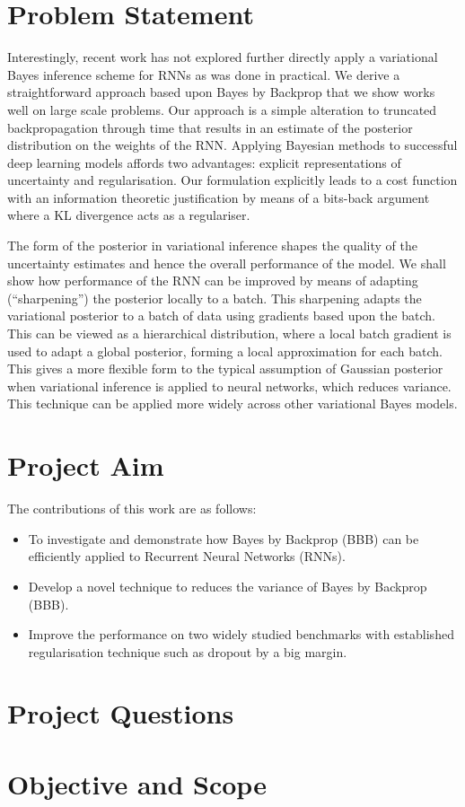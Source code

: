 
\section{Problem Statement}

Interestingly, recent work has not explored further directly apply a variational Bayes inference scheme for RNNs as was done in practical.
We derive a straightforward approach based upon Bayes by Backprop \cite{Blundell2015a} that we show works well on large scale problems.
Our approach is a simple alteration to truncated backpropagation through time that results in an estimate of the posterior distribution on the weights of the RNN.
Applying Bayesian methods to successful deep learning models affords two advantages: explicit representations of uncertainty and regularisation.
Our formulation explicitly leads to a cost function with an information theoretic justification by means of a bits-back argument \cite{Hinton1993} where a KL divergence acts as a regulariser.

The form of the posterior in variational inference shapes the quality of the uncertainty estimates and hence the overall performance of the model.
We shall show how performance of the RNN can be improved by means of adapting (``sharpening'') the posterior locally to a batch.
This sharpening adapts the variational posterior to a batch of data using gradients based upon the batch.
This can be viewed as a hierarchical distribution, where a local batch gradient is used to adapt a global posterior, forming a local approximation for each batch.
This gives a more flexible form  to the typical assumption of Gaussian posterior when variational inference is applied to neural networks, which reduces variance. This technique can be applied more widely across other variational Bayes models.

\section{Project Aim}

The contributions of this work are as follows:
\begin{itemize}
	\item To investigate and demonstrate how Bayes by Backprop (BBB) can be efficiently applied to Recurrent Neural Networks (RNNs).
	\item Develop a novel technique to reduces the variance of Bayes by Backprop (BBB).
	\item Improve the performance on two widely studied benchmarks with established regularisation technique such as dropout by a big margin.
\end{itemize}

\section{Project Questions}

\section{Objective and Scope}

